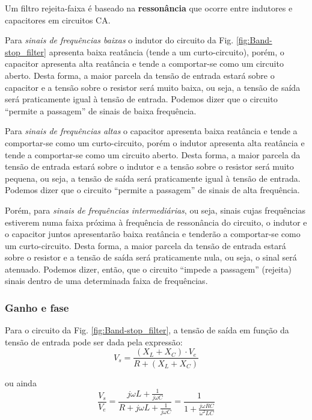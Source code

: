 \documentclass[letterpaper, 12pt]{article}
\begin{document}
Um filtro rejeita-faixa é baseado na \textbf{ressonância} que ocorre entre indutores e capacitores em circuitos CA.

Para \textit{sinais de frequências baixas} o indutor do circuito da Fig. \ref{fig:Band-stop_filter} apresenta baixa reatância (tende a um curto-circuito), porém, o capacitor apresenta alta reatância e tende a comportar-se como um circuito aberto. Desta forma, a maior parcela da tensão de entrada estará sobre o capacitor e a tensão sobre o resistor será muito baixa, ou seja, a tensão de saída será praticamente igual à tensão de entrada. Podemos dizer que o circuito “permite a passagem” de sinais de baixa frequência.

Para \textit{sinais de frequências altas} o capacitor apresenta baixa reatância e tende a comportar-se como um curto-circuito, porém o indutor apresenta alta reatância e tende a comportar-se como um circuito aberto. Desta forma, a maior parcela da tensão de entrada estará sobre o indutor e a tensão sobre o resistor será muito pequena, ou seja, a tensão de saída será praticamente igual à tensão de entrada. Podemos dizer que o circuito “permite a passagem” de sinais de alta frequência.

Porém, para \textit{sinais de frequências intermediárias}, ou seja, sinais cujas frequências estiverem numa faixa próxima à frequência de ressonância do circuito, o indutor e o capacitor juntos apresentarão baixa reatância e tenderão a comportar-se como um curto-circuito. Desta forma, a maior parcela da tensão de entrada estará sobre o resistor e a tensão de saída será praticamente nula, ou seja, o sinal será atenuado. Podemos dizer, então, que o circuito “impede a passagem” (rejeita) sinais dentro de uma determinada faixa de frequências. 


\subsubsection{Ganho e fase}\label{SubSubSec - Ganho e fase 2}
Para o circuito da Fig. \ref{fig:Band-stop_filter}, a tensão de saída em função da tensão de entrada pode ser dada pela expressão:
\begin{equation}\label{V_e - 02}
    V_{s}=\frac{(X_{L}+X_{C})\cdot V_{e}}{R+(X_{L}+X_{C})}
\end{equation}

ou ainda
\begin{equation}\label{V_s/V_e}
    \frac{V_{s}}{V_{e}}=\frac{j\omega L+\frac{1}{j\omega C}}{R+j\omega L+\frac{1}{j\omega C}}=\frac{1}{1+\frac{j\omega RC}{\omega^{2}LC}}
\end{equation}
\end{document}

